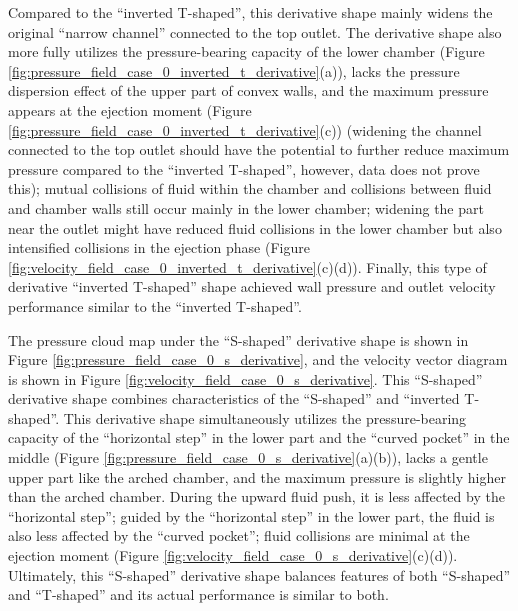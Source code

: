 \documentclass{article}
\begin{document}
Compared to the ``inverted T-shaped'', this derivative shape mainly widens the original ``narrow channel'' connected to the top outlet.
The derivative shape also more fully utilizes the pressure-bearing capacity of the lower chamber (Figure \ref{fig:pressure_field_case_0_inverted_t_derivative}(a)),
lacks the pressure dispersion effect of the upper part of convex walls, and the maximum pressure appears at the ejection moment (Figure \ref{fig:pressure_field_case_0_inverted_t_derivative}(c))
(widening the channel connected to the top outlet should have the potential to further reduce maximum pressure compared to the ``inverted T-shaped'', however, data does not prove this);
mutual collisions of fluid within the chamber and collisions between fluid and chamber walls still occur mainly in the lower chamber;
widening the part near the outlet might have reduced fluid collisions in the lower chamber but also intensified collisions in the ejection phase (Figure \ref{fig:velocity_field_case_0_inverted_t_derivative}(c)(d)).
Finally, this type of derivative ``inverted T-shaped'' shape achieved wall pressure and outlet velocity performance similar to the ``inverted T-shaped''.

The pressure cloud map under the ``S-shaped'' derivative shape is shown in Figure \ref{fig:pressure_field_case_0_s_derivative}, and the velocity vector diagram is shown in Figure \ref{fig:velocity_field_case_0_s_derivative}.
This ``S-shaped'' derivative shape combines characteristics of the ``S-shaped'' and ``inverted T-shaped''.
This derivative shape simultaneously utilizes the pressure-bearing capacity of the ``horizontal step'' in the lower part and the ``curved pocket'' in the middle (Figure \ref{fig:pressure_field_case_0_s_derivative}(a)(b)),
lacks a gentle upper part like the arched chamber, and the maximum pressure is slightly higher than the arched chamber.
During the upward fluid push, it is less affected by the ``horizontal step'';
guided by the ``horizontal step'' in the lower part, the fluid is also less affected by the ``curved pocket''; fluid collisions are minimal at the ejection moment (Figure \ref{fig:velocity_field_case_0_s_derivative}(c)(d)).
Ultimately, this ``S-shaped'' derivative shape balances features of both ``S-shaped'' and ``T-shaped'' and its actual performance is similar to both.
\end{document}
